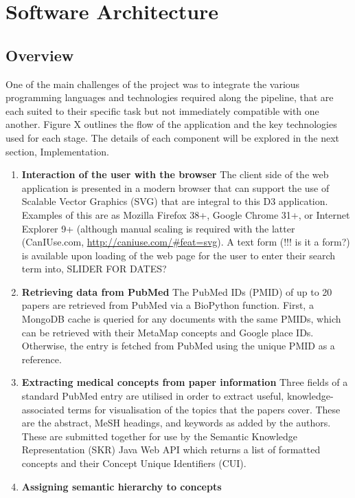 \documentclass[Report.tex]{subfiles}
\begin{document}
\chapter{Software Architecture}
\section{Overview}
One of the main challenges of the project was to integrate the various programming languages and technologies required along the pipeline, that are each suited to their specific task but not immediately compatible with one another. Figure X outlines the flow of the application and the key technologies used for each stage. The details of each component will be explored in the next section, Implementation.

\begin{enumerate}
\item{\textbf{Interaction of the user with the browser}} 
\newline The client side of the web application is presented in a modern browser that can support the use of Scalable Vector Graphics (SVG) that are integral to this D3 application. Examples of this are as Mozilla Firefox 38+, Google Chrome 31+, or Internet Explorer 9+ (although manual scaling is required with the latter (CanIUse.com, \url{http://caniuse.com/#feat=svg}). A text form (!!! is it a form?) is available upon loading of the web page for the user to enter their search term into, SLIDER FOR DATES?
\item{\textbf{Retrieving data from PubMed}}
\newline The PubMed IDs (PMID) of up to 20 papers are retrieved from PubMed via a BioPython function\cite{biopython}. First, a MongoDB cache is queried for any documents with the same PMIDs, which can be retrieved with their MetaMap concepts and Google place IDs. Otherwise, the entry is fetched from PubMed using the unique PMID as a reference. 
\item{\textbf{Extracting medical concepts from paper information}}
\newline Three fields of a standard PubMed entry are utilised in order to extract useful, knowledge-associated terms for visualisation of the topics that the papers cover. These are the abstract, MeSH headings, and keywords as added by the authors. These are submitted together for use by the Semantic Knowledge Representation (SKR) Java Web API which returns a list of formatted concepts and their Concept Unique Identifiers (CUI).
\item{\textbf{Assigning semantic hierarchy to concepts}}

\end{enumerate}
\end{document}
